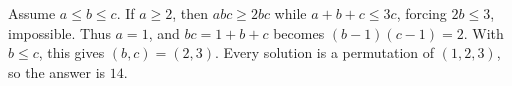Assume $a\le b\le c$. If $a\ge2$, then $abc\ge2bc$ while $a+b+c\le3c$, forcing $2b\le3$, impossible. Thus $a=1$, and $bc=1+b+c$ becomes $(b-1)(c-1)=2$. With $b\le c$, this gives $(b,c)=(2,3)$. Every solution is a permutation of $(1,2,3)$, so the answer is $\boxed{14}$.
